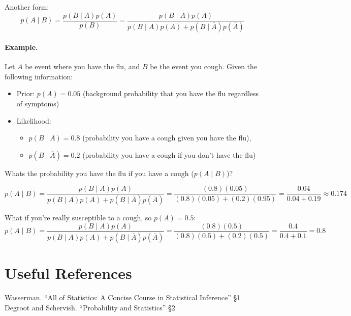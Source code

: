 Another form:
\[p(A\mid B) = \frac{p(B\mid A)p(A)}{p(B)} = \frac{p(B\mid A)p(A)}{p(B\mid A)p(A) + p(B\mid \overline A)p(\overline A)}\]

\paragraph{Example.} 
Let $A$ be event where you have the flu, and $B$ be the event you cough. 
Given the following information: 
\begin{itemize}
\item[] Prior: $p(A)=0.05$ (background probability that you have the flu regardless of symptoms)
\item[] Likelihood:
\begin{itemize} 
\item $p(B\mid A) = 0.8$ (probability you have a cough given you have the flu), 
\item $p(B\mid \overline A) = 0.2$ (probability you have a cough if you don't have the flu)
\end{itemize}
\end{itemize}
Whats the probability you have the flu if you have a cough ($p(A\mid B)$)?

\[p(A\mid B) = \frac{p(B\mid A)p(A)}{p(B\mid A)p(A) + p(B\mid \overline A)p(\overline A)} = \frac{(0.8)(0.05)}{(0.8)(0.05)+(0.2)(0.95)}=\frac{0.04}{0.04+0.19}\approx 0.174\]

What if you're really susceptible to a cough, so $p(A)=0.5$:
\[p(A\mid B) = \frac{p(B\mid A)p(A)}{p(B\mid A)p(A) + p(B\mid \overline A)p(\overline A)} = \frac{(0.8)(0.5)}{(0.8)(0.5)+(0.2)(0.5)}=\frac{0.4}{0.4+0.1}=0.8\]

\section*{Useful References}
Wasserman. ``All of Statistics: A Concise Course in Statistical Inference'' \S 1 
Degroot and Schervish. ``Probability and Statistics'' \S 2


